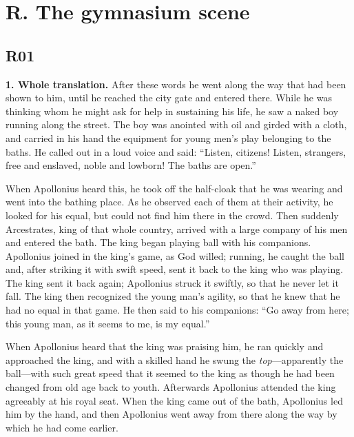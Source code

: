 \clearpage
\section*{R. The gymnasium scene}

\subsection*{R01}

\textbf{1. Whole translation.} After these words he went along the way that had been shown to him, until he reached the city gate and entered there. While he was thinking whom he might ask for help in sustaining his life, he saw a naked boy running along the street. The boy was anointed with oil and girded with a cloth, and carried in his hand the equipment for young men’s play belonging to the baths. He called out in a loud voice and said: “Listen, citizens! Listen, strangers, free and enslaved, noble and lowborn! The baths are open.”

When Apollonius heard this, he took off the half-cloak that he was wearing and went into the bathing place. As he observed each of them at their activity, he looked for his equal, but could not find him there in the crowd. Then suddenly Arcestrates, king of that whole country, arrived with a large company of his men and entered the bath. The king began playing ball with his companions. Apollonius joined in the king’s game, as God willed; running, he caught the ball and, after striking it with swift speed, sent it back to the king who was playing. The king sent it back again; Apollonius struck it swiftly, so that he never let it fall. The king then recognized the young man’s agility, so that he knew that he had no equal in that game. He then said to his companions: “Go away from here; this young man, as it seems to me, is my equal.”

When Apollonius heard that the king was praising him, he ran quickly and approached the king, and with a skilled hand he swung the \emph{top}—apparently the ball—with such great speed that it seemed to the king as though he had been changed from old age back to youth. Afterwards Apollonius attended the king agreeably at his royal seat. When the king came out of the bath, Apollonius led him by the hand, and then Apollonius went away from there along the way by which he had come earlier.

